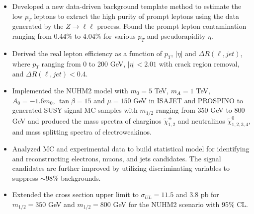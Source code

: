 \documentclass[margin, 10pt]{res} %
\begin{document}
\begin{resume}
\begin{itemize}
    \item Developed a new data-driven background template method to estimate the low $p_{T}$ leptons to extract the high purity of prompt leptons using the data generated by the  $Z \rightarrow \ell\ell$ process. Found the prompt lepton contamination ranging from 0.44\% to 4.04\% for various $p_{T}$ and pseudorapidity $\eta$.
    \item Derived the real lepton efficiency as a function of $p_{T}$, $|\eta|$ and $\Delta R(\ell, jet)$, where $p_{T}$ ranging from 0 to 200 GeV, $|\eta| < 2.01$ with crack region removal, and $\Delta R(\ell, jet) < 0.4$.
    \item Implemented the NUHM2 model with $m_{0} = 5$ TeV, $m_{A} = 1$ TeV, $A_{0} = -1.6 m_{0}$, $\tan\beta = 15$ and $\mu = 150$ GeV in ISAJET and PROSPINO to generated SUSY signal MC samples with $m_{1/2}$ ranging from 350 GeV to 800 GeV and produced the mass spectra of charginos $\tilde{\chi}^{\pm}_{1,2}$ and neutralinos $\tilde{\chi}^{0}_{1,2,3,4}$, and mass splitting spectra of electroweakinos.
    \item Analyzed MC and experimental data to build statistical model for identifying and reconstructing electrons, muons, and jets candidates. The signal candidates are further improved by utilizing discriminating variables to suppress $\sim$98\% backgrounds.
    \item Extended the cross section upper limit to $\sigma_{UL} = 11.5$ and $3.8$ pb for $m_{1/2}=350$ GeV and $m_{1/2}=800$ GeV for the NUHM2 scenario with 95\% CL.

\end{itemize}
\end{resume}
\end{document}
